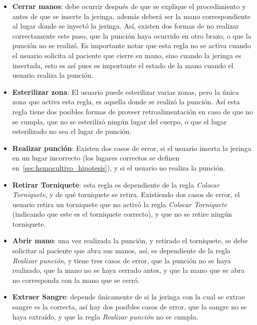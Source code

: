 \begin{itemize}
\item \textbf{Cerrar manos}: debe ocurrir después de que se explique el
    procedimiento y antes de que se inserte la jeringa, además deberá ser la
    mano correspondiente al lugar donde se inyectó la jeringa. Así, existen dos
    formas de no realizar correctamente este paso, que la punción haya ocurrido en otro brazo, o
    que la punción no se realizó. Es importante notar que esta regla no se activa
    cuando el usuario solicita al paciente que cierre su mano, sino cuando la
    jeringa es insertada, esto es así pues es importante el estado de la mano
    cuando el usuario realiza la punción.

\item \textbf{Esterilizar zona}: El usuario puede esterilizar varias zonas, pero
    la única zona que activa esta regla, es aquella donde se realizó la punción.
    Así esta regla tiene dos posibles formas de proveer retroalimentación en
    caso de que no se cumpla, que no se esterilizó ningún lugar del cuerpo, o
    que el lugar esterilizado no sea el lugar de punción.

\item \textbf{Realizar punción}: Existen dos casos de error, si el usuario
    inserta la jeringa en un lugar incorrecto (los lugares correctos se definen
    en~\ref{sec:hemocultivo_hipotesis}), y si el usuario no realiza la punción.

\item \textbf{Retirar Torniquete}: esta regla es dependiente de la regla
    \emph{Colocar Torniquete}, y de qué torniquete se retira. Existiendo dos
    casos de error, el usuario retira un torniquete que no activó la regla
    \emph{Colocar Torniquete} (indicando que este es el torniquete correcto), y
    que no se retire ningún torniquete.

\item \textbf{Abrir mano}: una vez realizada la punción, y retirado el torniquete,
    se debe solicitar al paciente que abra sus manos, así, es dependiente de la
    regla \emph{Realizar punción}, y tiene tres casos de error, que la punción
    no se haya realizado, que la mano no se haya cerrado antes, y que la mano
    que se abra no corresponda con la mano que se cerró.

\item \textbf{Extraer Sangre}: depende únicamente de si la jeringa con la cual
    se extrae sangre es la correcta, así hay dos posibles casos de error, que
    la sangre no se haya extraído, y que la regla \emph{Realizar punción} no se
    cumpla.


\end{itemize}
